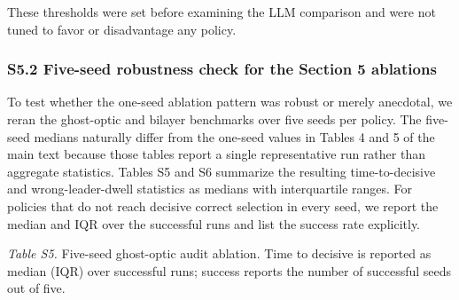 \documentclass[
]{article}
\begin{document}
These thresholds were set before examining the LLM comparison and were
not tuned to favor or disadvantage any policy.

\hypertarget{s5.2-five-seed-robustness-check-for-the-section-5-ablations}{%
\subsubsection{S5.2 Five-seed robustness check for the Section 5
ablations}\label{s5.2-five-seed-robustness-check-for-the-section-5-ablations}}

To test whether the one-seed ablation pattern was robust or merely
anecdotal, we reran the ghost-optic and bilayer benchmarks over five
seeds per policy. The five-seed medians naturally differ from the
one-seed values in Tables 4 and 5 of the main text because those tables
report a single representative run rather than aggregate statistics.
Tables S5 and S6 summarize the resulting time-to-decisive and
wrong-leader-dwell statistics as medians with interquartile ranges. For
policies that do not reach decisive correct selection in every seed, we
report the median and IQR over the successful runs and list the success
rate explicitly.

\emph{Table S5.} Five-seed ghost-optic audit ablation. Time to decisive
is reported as median (IQR) over successful runs; success reports the
number of successful seeds out of five.
\end{document}

